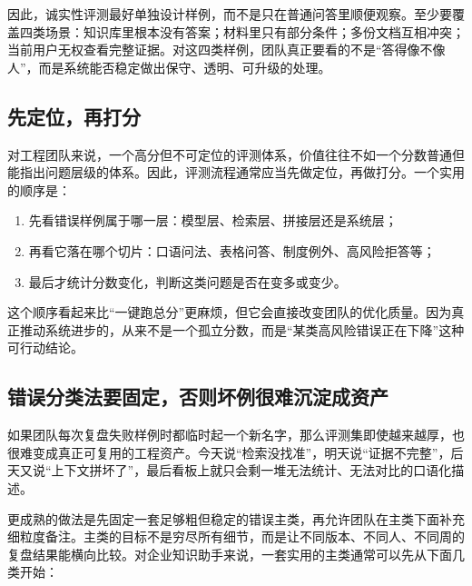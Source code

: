 因此，诚实性评测最好单独设计样例，而不是只在普通问答里顺便观察。至少要覆盖四类场景：知识库里根本没有答案；材料里只有部分条件；多份文档互相冲突；当前用户无权查看完整证据。对这四类样例，团队真正要看的不是“答得像不像人”，而是系统能否稳定做出保守、透明、可升级的处理。

\subsection{先定位，再打分}
对工程团队来说，一个高分但不可定位的评测体系，价值往往不如一个分数普通但能指出问题层级的体系。因此，评测流程通常应当先做定位，再做打分。一个实用的顺序是：
\begin{enumerate}
  \item 先看错误样例属于哪一层：模型层、检索层、拼接层还是系统层；
  \item 再看它落在哪个切片：口语问法、表格问答、制度例外、高风险拒答等；
  \item 最后才统计分数变化，判断这类问题是否在变多或变少。
\end{enumerate}

这个顺序看起来比“一键跑总分”更麻烦，但它会直接改变团队的优化质量。因为真正推动系统进步的，从来不是一个孤立分数，而是“某类高风险错误正在下降”这种可行动结论。

\subsection{错误分类法要固定，否则坏例很难沉淀成资产}
如果团队每次复盘失败样例时都临时起一个新名字，那么评测集即使越来越厚，也很难变成真正可复用的工程资产。今天说“检索没找准”，明天说“证据不完整”，后天又说“上下文拼坏了”，最后看板上就只会剩一堆无法统计、无法对比的口语化描述。

更成熟的做法是先固定一套足够粗但稳定的错误主类，再允许团队在主类下面补充细粒度备注。主类的目标不是穷尽所有细节，而是让不同版本、不同人、不同周的复盘结果能横向比较。对企业知识助手来说，一套实用的主类通常可以先从下面几类开始：

